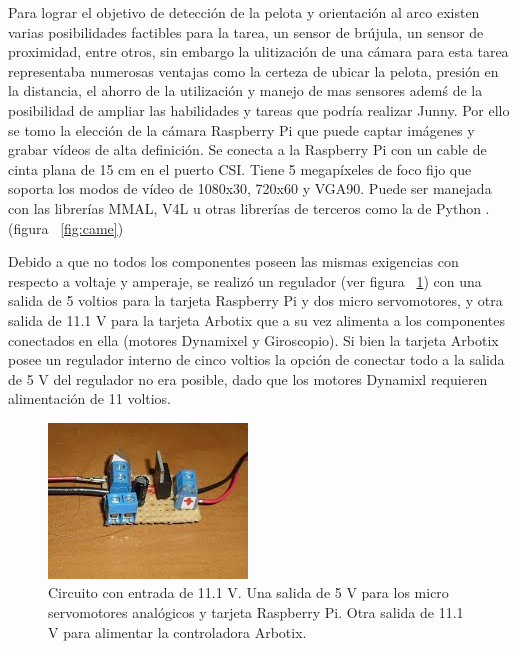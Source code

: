 Para lograr el objetivo de detecci\'on de la pelota y orientaci\'on al arco existen varias posibilidades factibles para la tarea, un sensor de br\'ujula, un sensor de proximidad, entre otros, sin embargo la ulitizaci\'on de una c\'amara para esta tarea representaba numerosas ventajas como la certeza de ubicar la pelota, presi\'on en la distancia, el ahorro de la utilizaci\'on y manejo de mas sensores adem\'s de la posibilidad de ampliar las habilidades y tareas que podr\'ia realizar Junny. Por ello se tomo la elecci\'on de la     
c\'amara Raspberry Pi que puede captar im\'agenes y grabar vídeos de alta definición. Se conecta a la Raspberry Pi con un cable de cinta plana de 15 cm en el puerto CSI. Tiene 5 megapíxeles de foco fijo que soporta los modos de vídeo de 1080x30, 720x60 y VGA90. Puede ser manejada con las librerías MMAL, V4L u otras librerías de terceros como la de Python \cite{raspberrycam}.(figura ~\ref{fig:came})  %

Debido a que no todos los componentes poseen las mismas exigencias con respecto a voltaje y amperaje, se realizó un regulador (ver figura ~\ref{fig:circuito}) con una salida de 5 voltios para la tarjeta Raspberry Pi y dos micro servomotores, y otra salida de 11.1 V para la tarjeta Arbotix que a su vez alimenta a los componentes conectados en ella (motores Dynamixel y Giroscopio). Si bien la tarjeta Arbotix posee un regulador interno de cinco voltios la opción de conectar todo a la salida de 5 V del regulador no era posible, dado que los motores Dynamixl requieren alimentación de 11 voltios.

\begin{figure}[hbtp]
\centering
\includegraphics[scale=0.5]{imagenes/circuito.jpg}
\caption{Circuito con entrada de 11.1 V. Una salida de 5 V para los micro servomotores anal\'ogicos y tarjeta Raspberry Pi. Otra salida de 11.1 V para alimentar la controladora Arbotix.}
\label{fig:circuito}
\end{figure}


